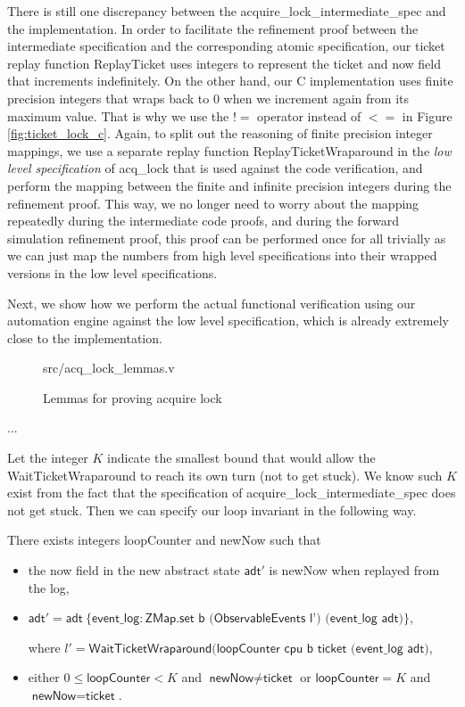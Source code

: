 There is still one discrepancy between the \textsf{acquire\_lock\_intermediate\_spec} and the
implementation. In order to facilitate the refinement proof between the intermediate specification
and the corresponding atomic specification, our ticket replay function \textsf{ReplayTicket}
uses integers to represent the \textsf{ticket} and \textsf{now} field that increments indefinitely.
On the other hand, our C implementation uses finite precision integers that wraps back to 0 when
we increment again from its maximum value. That is why we use the $!=$ operator instead
of $<=$ in Figure \ref{fig:ticket_lock_c}.
Again, to split out the reasoning of finite precision integer mappings, we use a separate
replay function \textsf{ReplayTicketWraparound} in the \textit{low level specification} of
\textsf{acq\_lock} that is used against the code verification, and perform the mapping between
the finite and infinite precision integers during the refinement proof. This way, we no longer
need to worry about the mapping repeatedly during the intermediate code proofs, and during
the forward simulation refinement proof, this proof can be performed once for all trivially as
we can just map the numbers from high level specifications into their wrapped versions
in the low level specifications.

Next, we show how we perform the actual functional verification using our automation engine
against the low level specification, which is already extremely close to the implementation.


\begin{figure}
	 {src/acq_lock_lemmas.v}
	\caption{Lemmas for proving acquire lock}
	\label{fig:acq_lock_lemmas_v}
\end{figure}

...

Let the integer $K$ indicate the smallest bound that would allow the \textsf{WaitTicketWraparound}
to reach its own turn (not to get stuck). We know such $K$ exist from the fact that the specification
of \textsf{acquire\_lock\_intermediate\_spec} does not get stuck. Then we can specify
our loop invariant in the following way. 

\begin{definition}
There exists integers \textsf{loopCounter} and \textsf{newNow} such that
\begin{itemize}
\item the \textsf{now} field in the new abstract state $\textsf{adt}'$ is \textsf{newNow} when replayed from the log,
\item $\textsf{adt}' = \textsf{adt}~\{\textsf{event\_log}: \textsf{ZMap.set b (ObservableEvents l') (event\_log adt)}\}$,


where $l' = \textsf{WaitTicketWraparound}(\textsf{loopCounter cpu b ticket (event\_log adt)}$,
\item either $0\le \textsf{loopCounter}<K$ and $\textsf{newNow}\neq\textsf{ticket}$ or
$\textsf{loopCounter}=K$ and $\textsf{newNow}=\textsf{ticket}$.
\end{itemize}
\end{definition}

